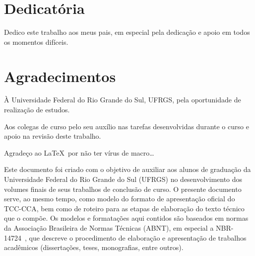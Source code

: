 \documentclass[repeatfields,xlists,xpacks,oneside]{ufrgscca}
\begin{document}


\notoc\chapter{Dedicatória} %

Dedico este trabalho aos meus pais, em especial pela dedicação e apoio em
todos os momentos difíceis.

\notoc\chapter{Agradecimentos}

\`{A} Universidade Federal do Rio Grande do Sul, UFRGS, pela
oportunidade de realização de estudos.

Aos colegas de curso pelo seu auxílio nas tarefas desenvolvidas durante o
curso e apoio na revisão deste trabalho.

Agradeço ao \LaTeX\ por não ter vírus de macro\ldots


%


\begin{mainabstract}

Este documento foi criado com o objetivo de auxiliar aos alunos
de graduação
da Universidade Federal do Rio Grande do Sul (UFRGS) no desenvolvimento dos
volumes finais de seus trabalhos de conclus\~{a}o de curso. O presente
documento serve, ao mesmo tempo, como modelo do formato de apresentação
oficial do TCC-CCA, bem como de roteiro para as etapas de elaboração do texto
técnico que o compõe. Os modelos e formatações aqui contidos são baseados em
normas da Associação Brasileira de Normas Técnicas (ABNT), em especial a
NBR-14724~\cite{ABNT:NBR-14724-2011}, que descreve o procedimento de elaboração e
apresentação de trabalhos acadêmicos (dissertações, teses, monografias,
entre outros).

\end{mainabstract}
\end{document}
